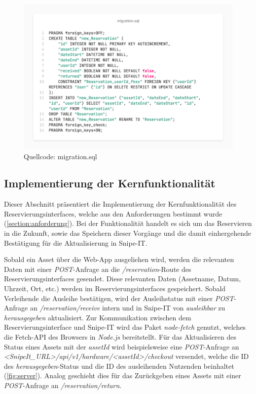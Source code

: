 \begin{figure}[h]
  \centering
  \includegraphics[scale=0.35]{Bilder/screenshot(7).png}
  \caption[Quellcode: migration.sql]{Quellcode: migration.sql}
  \label{fig:mig}
\end{figure}


\subsection{Implementierung der Kernfunktionalität}
Dieser Abschnitt präsentiert die Implementierung der Kernfunktionalität des
Reservierungsinterfaces, welche aus den Anforderungen bestimmt wurde (\ref{section:anforderung}).
Bei der Funktionalität handelt es sich um das Reservieren in die Zukunft, sowie das Speichern
dieser Vorgänge und die damit einhergehende Bestätigung für die Aktualisierung in Snipe-IT.


Sobald ein Asset über die Web-App ausgeliehen wird, werden die relevanten Daten mit einer
\textit{POST}-Anfrage an die \textit{/reservation}-Route des Reservierungsinterfaces gesendet.
Diese relevanten Daten (Assetname, Datum, Uhrzeit, Ort, etc.) werden im Reservierungsinterfaces
gespeichert. Sobald Verleihende die Ausleihe bestätigen, wird der Ausleihstatus mit einer
\textit{POST}-Anfrage an \textit{/reservation/receive} intern und in Snipe-IT von
\textit{ausleihbar} zu \textit{herausgegeben} aktualisiert. Zur Kommunikation zwischen dem
Reservierungsinterface und Snipe-IT wird das Paket \textit{node-fetch} genutzt, welches die
Fetch-API des Browsers in \textit{Node.js} bereitstellt. Für das Aktualisieren des Status eines
Assets mit der \textit{assetId} wird beispielsweise eine \textit{POST}-Anfrage an
\textit{<SnipeIt\_URL>/api/v1/hardware/<assetId>/checkout} versendet, welche die ID des
\textit{herausgegeben}-Status und die ID des ausleihenden Nutzenden beinhaltet (\ref{fig:server}).
Analog geschieht dies für das Zurückgeben eines Assets mit einer \textit{POST}-Anfrage an
\textit{/reservation/return}.


